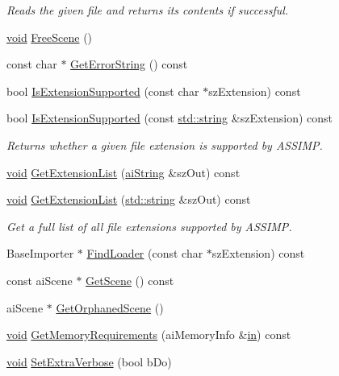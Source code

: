 \begin{DoxyCompactItemize}
\begin{DoxyCompactList}\small\item\em Reads the given file and returns its contents if successful. \end{DoxyCompactList}\item 
\hyperlink{wglew_8h_aeea6e3dfae3acf232096f57d2d57f084}{void} \hyperlink{class_assimp_1_1_importer_a53dafc3046abc33365a07c605716c5d4}{Free\-Scene} ()
\item 
const char $\ast$ \hyperlink{class_assimp_1_1_importer_a23bab5ba8cb9b6886c690a610766668b}{Get\-Error\-String} () const 
\item 
bool \hyperlink{class_assimp_1_1_importer_a9146ea75c33c0aac0310195346877388}{Is\-Extension\-Supported} (const char $\ast$sz\-Extension) const 
\item 
bool \hyperlink{class_assimp_1_1_importer_a5b01905366f5bf8d1f89d51f755bf7d2}{Is\-Extension\-Supported} (const \hyperlink{glew_8h_ae84541b4f3d8e1ea24ec0f466a8c568b}{std\-::string} \&sz\-Extension) const 
\begin{DoxyCompactList}\small\item\em Returns whether a given file extension is supported by A\-S\-S\-I\-M\-P. \end{DoxyCompactList}\item 
\hyperlink{wglew_8h_aeea6e3dfae3acf232096f57d2d57f084}{void} \hyperlink{class_assimp_1_1_importer_a23c85647f7977012d9fef20b36c2d579}{Get\-Extension\-List} (\hyperlink{structai_string}{ai\-String} \&sz\-Out) const 
\item 
\hyperlink{wglew_8h_aeea6e3dfae3acf232096f57d2d57f084}{void} \hyperlink{class_assimp_1_1_importer_a6ab684351c55e170de3c5b7d730b306d}{Get\-Extension\-List} (\hyperlink{glew_8h_ae84541b4f3d8e1ea24ec0f466a8c568b}{std\-::string} \&sz\-Out) const 
\begin{DoxyCompactList}\small\item\em Get a full list of all file extensions supported by A\-S\-S\-I\-M\-P. \end{DoxyCompactList}\item 
Base\-Importer $\ast$ \hyperlink{class_assimp_1_1_importer_a4c1803f4397432eebad5545efdefce89}{Find\-Loader} (const char $\ast$sz\-Extension) const 
\item 
const ai\-Scene $\ast$ \hyperlink{class_assimp_1_1_importer_a26fd479a6a955969c1377fa59f92db66}{Get\-Scene} () const 
\item 
ai\-Scene $\ast$ \hyperlink{class_assimp_1_1_importer_a60eb9042fb85bfbd61a863e131a56ecd}{Get\-Orphaned\-Scene} ()
\item 
\hyperlink{wglew_8h_aeea6e3dfae3acf232096f57d2d57f084}{void} \hyperlink{class_assimp_1_1_importer_aba2eacd0b627cb481b6d66d9ca55eac9}{Get\-Memory\-Requirements} (ai\-Memory\-Info \&\hyperlink{glew_8h_a83ad0ee7f1e06b59c90271716e689080}{in}) const 
\item 
\hyperlink{wglew_8h_aeea6e3dfae3acf232096f57d2d57f084}{void} \hyperlink{class_assimp_1_1_importer_a9bb793072c84c784279d0f6e870bb42d}{Set\-Extra\-Verbose} (bool b\-Do)
\end{DoxyCompactItemize}
